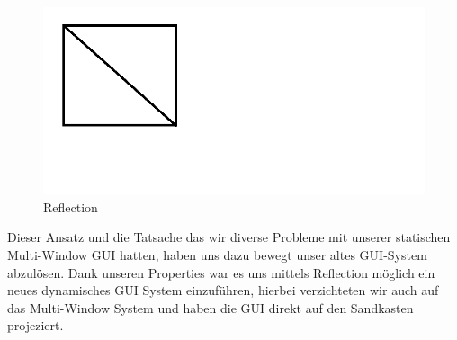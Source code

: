 \begin{figure}[h!]
	\vspace*{30px}
	\includegraphics[width=\columnwidth]{graphics/reflection.png}	
	\caption{Reflection}
	\label{fig:Reflection}
\end{figure}

Dieser Ansatz und die Tatsache das wir diverse Probleme mit unserer statischen Multi-Window GUI hatten, haben uns dazu bewegt unser altes GUI-System abzulösen.
Dank unseren Properties war es uns mittels Reflection möglich ein neues dynamisches GUI System einzuführen, hierbei verzichteten wir auch auf das Multi-Window System und haben die GUI direkt auf den Sandkasten projeziert.


\clearpage
